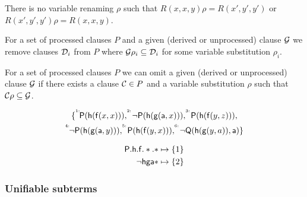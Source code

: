\begin{example}
	There is no variable renaming \( \rho \) such that
	\( R(x,x,y) \rho = R(x',y',y') \) or
	\( R(x',y',y') \rho = R(x,x,y) \).

\end{example}

\begin{definition}
	For a set of processed clauses \( P \)
	and a given (derived or unprocessed) clause \( \mathcal{G} \) we
	 remove clauses \( \mathcal{D}_i \) from \( P \) where
	 \( \mathcal{G}\rho_i \subseteq \mathcal{D}_i \) for some
	 variable substitution \( \rho_i \).
\end{definition}

\begin{definition}
	For a set of processed clauses \( P \)
	we can omit a given (derived or unprocessed) clause \( \mathcal{G} \)
	if there exists a clause \( \mathcal{C} \in P \)
	and a variable substitution \( \rho \) such that \( \mathcal{C}\rho\subseteq \mathcal{G} \).
\end{definition}

\begin{gather*}
	\{
	^{^{1:}}\!\mathsf{P}(\mathsf{h}(\mathsf{f}(x,x))),
	^{^{2:}}\!\lnot\mathsf{P}(\mathsf{h}(\mathsf{g}(\mathsf{a},x))),
	^{^{3:}}\!\mathsf{P}(\mathsf{h}(\mathsf{f}(y,z))),
	\\
	^{^{4:}}\!\lnot\mathsf{P}(\mathsf{h}(\mathsf{g}(\mathsf{a},y))),
	^{^{5:}}\!\mathsf{P}(\mathsf{h}(\mathsf{f}(y,x))),
	^{^{6:}}\!\lnot\mathsf{Q}(\mathsf{h}(\mathsf{g}(y,a)),\mathsf{a})
	\}
	\end{gather*}

	\begin{align*}
		\mathsf{P}.\mathsf{h}.\mathsf{f}.*.* &\mapsto \{ 1 \}
		\\
		\lnot \mathsf{h} \mathsf{g} \mathsf{a} * &\mapsto \{ 2 \}
	\end{align*}

\subsubsection{Unifiable subterms}

